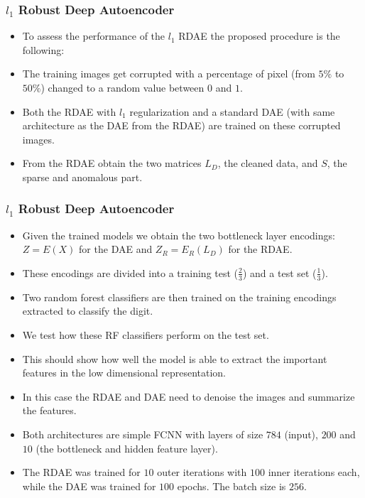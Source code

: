 \documentclass{beamer}
\theoremstyle{plain}
\theoremstyle{definition}
\theoremstyle{remark}
\begin{document}
\begin{frame}
	\frametitle{$l_1$ Robust Deep Autoencoder}
	\begin{itemize}
		\item To assess the performance of the $l_1$ RDAE the proposed procedure is the following:
		\item The training images get corrupted with a percentage of pixel (from $5\%$ to $50\%$) changed to a random value between $0$ and $1$.
		\item Both the RDAE with $l_1$ regularization and a standard DAE (with same architecture as the DAE from the RDAE) are trained on these corrupted images.
		\item From the RDAE obtain the two matrices $L_D$, the cleaned data, and $S$, the sparse and anomalous part.
	\end{itemize}
\end{frame}

\begin{frame}
	\frametitle{$l_1$ Robust Deep Autoencoder}
	\begin{itemize}
		\item Given the trained models we obtain the two bottleneck layer encodings: $Z = E(X)$ for the DAE and $Z_R=E_R(L_D)$ for the RDAE.
		\item These encodings are divided into a training test ($\frac{2}{3}$) and a test set ($\frac{1}{3}$).
		\item Two random forest classifiers are then trained on the training encodings extracted to classify the digit.
		\item We test how these RF classifiers perform on the test set.
	\end{itemize}
\end{frame}

\begin{frame}
	\begin{itemize}
		\item This should show how well the model is able to extract the important features in the low dimensional representation.
		\item In this case the RDAE and DAE need to denoise the images and summarize the features.
		\item Both architectures are simple FCNN with layers of size $784$ (input), $200$ and $10$ (the bottleneck and hidden feature layer).
		\item The RDAE was trained for $10$ outer iterations with $100$ inner iterations each, while the DAE was trained for $100$ epochs. The batch size is $256$.
	\end{itemize}
\end{frame}
\end{document}
